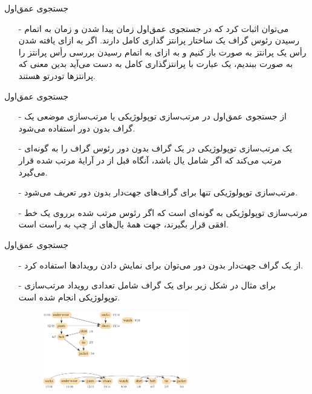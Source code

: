 \begin{frame}{‌جستجوی عمق‌اول}
\begin{itemize}\itemr
\item[-]
می‌توان اثبات کرد که در جستجوی عمق‌اول زمان پیدا شدن و زمان به اتمام رسیدن رئوس گراف یک ساختار پرانتز گذاری کامل دارند. اگر به ازای یافته شدن رأس
یک پرانتز به صورت
باز کنیم و به ازای به اتمام رسیدن بررسی رأس
پرانتز را به صورت
ببندیم، یک عبارت با پرانتزگذاری کامل به دست می‌آید بدین معنی که پرانتزها تودرتو هستند.
\end{itemize}
\end{frame}


\begin{frame}{‌جستجوی عمق‌اول}
\begin{itemize}\itemr
\item[-]
از جستجوی عمق‌اول در مرتب‌سازی توپولوژیکی
یا مرتب‌سازی موضعی
یک گراف بدون دور
استفاده می‌شود.
\item[-]
یک مرتب‌سازی توپولوژیکی در یک گراف بدون دور
رئوس گراف را به گونه‌ای مرتب می‌کند که اگر
شامل یال
باشد، آنگاه
قبل از
در آرایهٔ مرتب شده قرار می‌گیرد.
\item[-]
مرتب‌سازی توپولوژیکی تنها برای گراف‌های جهت‌دار بدون دور
تعریف می‌شود.
\item[-]
مرتب‌سازی توپولوژیکی به گونه‌ای است که اگر رئوس مرتب شده برروی یک خط افقی قرار بگیرند، جهت همهٔ یال‌های از چپ به راست است.
\end{itemize}
\end{frame}


\begin{frame}{‌جستجوی عمق‌اول}
\begin{itemize}\itemr
\item[-]
از یک گراف جهت‌دار بدون دور می‌توان برای نمایش دادن رویداد‌ها
استفاده کرد.
\item[-]
برای مثال در شکل زیر برای یک گراف شامل تعدادی رویداد مرتب‌سازی توپولوژیکی انجام شده است.
\begin{figure}
\includegraphics[width=0.6\textwidth]{figs/chap07/574-topological}
\end{figure}
\end{itemize}
\end{frame}